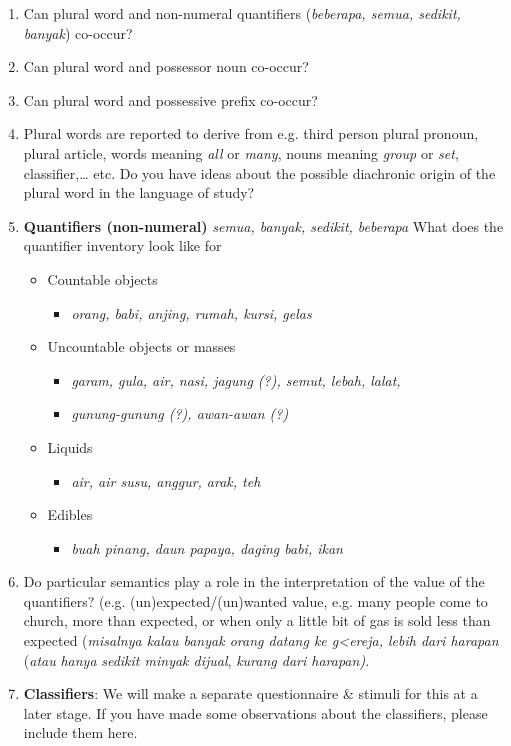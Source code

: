 \begin{enumerate}
\item  Can plural word and non-numeral quantifiers (\textit{beberapa, semua, sedikit, banyak}) co-occur? 
\item Can plural word and possessor noun co-occur? 
\item  Can plural word and possessive prefix co-occur? 
\item  Plural words are reported to derive from e.g. third person plural pronoun, plural article, words meaning \textit{all} or \textit{many}, nouns meaning \textit{group} or \textit{set}, classifier,{\dots} etc. Do you have ideas about the possible diachronic origin of the plural word in the language of study?
\item  \textbf{Quantifiers (non-numeral)} \textit{semua, banyak, sedikit, beberapa}
What does the quantifier inventory look like for
\begin{itemize}
\item Countable objects 
\begin{itemize}
\item \textit{orang, babi, anjing, rumah, kursi, gelas}
\end{itemize}
\item Uncountable objects or masses 
\begin{itemize}
\item \textit{garam, gula, air, nasi, jagung (?), semut, lebah, lalat,} 
\item \textit{gunung-gunung (?), awan-awan (?)}
\end{itemize}
\item Liquids 
\begin{itemize}
\item \textit{air, air susu, anggur, arak, teh}
\end{itemize}
\item Edibles 
\begin{itemize}
\item \textit{buah pinang, daun papaya, daging babi, ikan}  
\end{itemize}
\end{itemize}
\item  Do particular semantics play a role in the interpretation of the value of the quantifiers? (e.g. (un)expected/(un)wanted value, e.g. many people come to church, more than expected, or when only a little bit of gas is sold less than expected (\textit{misalnya kalau banyak orang datang ke g<ereja, lebih dari harapan} (\textit{atau} \textit{hanya} \textit{sedikit minyak dijual}, \textit{kurang dari harapan).}
\item  \textbf{Classifiers}: We will make a separate questionnaire \& stimuli for this at a later stage. If you have made some observations about the classifiers, please include them here. 
\end{enumerate}


